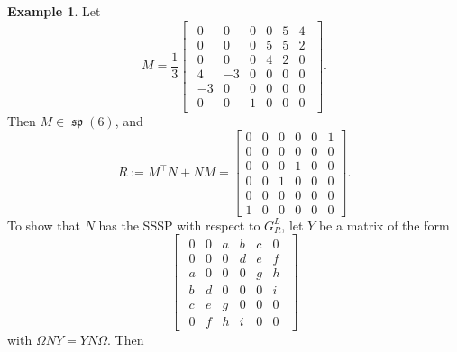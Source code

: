 \documentclass[12pt]{article}
\theoremstyle{definition}
\theoremstyle{definition}
\theoremstyle{definition}
\newtheorem{ex}[thm]{Example}
\numberwithin{figure}{section}
\numberwithin{equation}{section}
\newcommand{\spLA}{\operatorname{\mathfrak{sp}}}
\newcommand{\trans}{^{\top}}
\begin{document}
\begin{ex}
Let 
\[ 
M=\frac{1}{3}
\begin{bmatrix}
\begin{array}{rrrrrr}
0 & 0 & 0 & 0 & {5} & {4} \\
0 & 0 & 0 & {5} & {5} & {2} \\
0 & 0 & 0 & {4} & {2} & 0 \\
{4} & -3 & 0 & 0 & 0 & 0 \\
-3 & 0 & 0 & 0 & 0 & 0 \\
0 & 0 & {1} & 0 & 0 & 0
\end{array}\end{bmatrix}.
\] 
Then $M\in \spLA(6)$, 
and 
\[
R:=M\trans N+NM =
\begin{bmatrix}
    0 & 0 & 0 & 0 & 0 & 1\\
    0 & 0 & 0 & 0 & 0 & 0 \\
    0 & 0 & 0 & 1 & 0 & 0\\
    0 & 0 & 1 & 0 & 0 & 0 \\
    0 & 0 & 0 & 0 & 0 &0 \\
    1 & 0 & 0 & 0 & 0 &0
\end{bmatrix}. 
\]
To show that $N$ has the SSSP with respect to $G^L_R$,
let   $Y$ be a matrix of the form 
\[ 
\begin{bmatrix} 
\begin{array}{rrrrrr}
0 & 0 & a & b & c & 0 \\
0 & 0 & 0 & d & e & f \\
a & 0 & 0 & 0 & g & h \\
b & d & 0 & 0 & 0 & i \\
c & e & g & 0 & 0 & 0 \\
0 & f & h & i & 0 & 0
\end{array}\end{bmatrix} 
\] 
with $\Omega NY=YN\Omega$. 
Then 


\end{ex}
\end{document}
